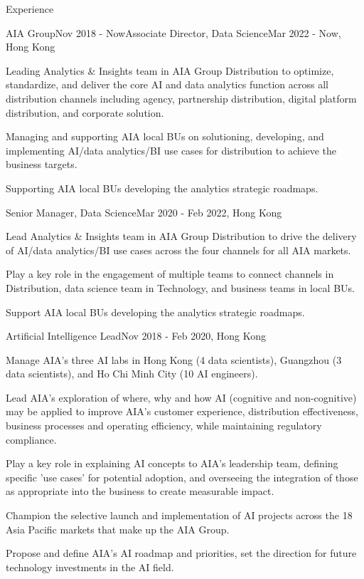 \documentclass{resume} %
\begin{document}
\begin{rSection}{Experience}

\begin{rSubsection}{AIA Group}{Nov 2018 - Now}{Associate Director, Data Science}{Mar 2022 - Now, Hong Kong}
\item Leading Analytics \& Insights team in AIA Group Distribution to optimize, standardize, and deliver the core AI and data analytics function across all distribution channels including agency, partnership distribution, digital platform distribution, and corporate solution.
\item Managing and supporting AIA local BUs on solutioning, developing, and implementing AI/data analytics/BI use cases for distribution to achieve the business targets.
\item Supporting AIA local BUs developing the analytics strategic roadmaps.
\end{rSubsection}


\begin{rSubsection}{}{}{Senior Manager, Data Science}{Mar 2020 - Feb 2022, Hong Kong}
\item Lead Analytics \& Insights team in AIA Group Distribution to drive the delivery of AI/data analytics/BI use cases across the four channels for all AIA markets.
\item Play a key role in the engagement of multiple teams to connect channels in Distribution, data science team in Technology, and business teams in local BUs.
\item Support AIA local BUs developing the analytics strategic roadmaps.
\end{rSubsection}


\begin{rSubsection}{}{}{Artificial Intelligence Lead}{Nov 2018 - Feb 2020, Hong Kong}
\item Manage AIA’s three AI labs in Hong Kong (4 data scientists), Guangzhou (3 data scientists), and Ho Chi Minh City (10 AI engineers).
\item Lead AIA's exploration of where, why and how AI (cognitive and non-cognitive) may be applied to improve AIA's customer experience, distribution effectiveness, business processes and operating efficiency, while maintaining regulatory compliance.
\item Play a key role in explaining AI concepts to AIA's leadership team, defining specific 'use cases' for potential adoption, and overseeing the integration of those as appropriate into the business to create measurable impact.
\item Champion the selective launch and implementation of AI projects across the 18 Asia Pacific markets that make up the AIA Group.
\item Propose and define AIA's AI roadmap and priorities, set the direction for future technology investments in the AI field.
\end{rSubsection}


\end{rSection}
\end{document}
